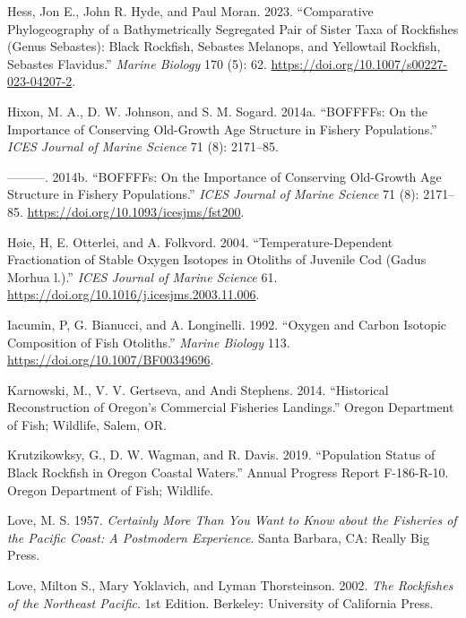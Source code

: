 \documentclass[11pt,
  english,
  letterpaper,
]{article}
\newlength{\cslhangindent}
\newenvironment{CSLReferences}[2] %
 {%
  \setlength{\parindent}{0pt}
  \ifodd #1 \everypar{\setlength{\hangindent}{\cslhangindent}}\ignorespaces\fi
  \ifnum #2 > 0
  \setlength{\parskip}{#2\baselineskip}
  \fi
 }%
 {}
\begin{document}
\begin{CSLReferences}{1}{0}
\leavevmode{}%
Hess, Jon E., John R. Hyde, and Paul Moran. 2023. {``Comparative Phylogeography of a Bathymetrically Segregated Pair of Sister Taxa of Rockfishes (Genus Sebastes): Black Rockfish, Sebastes Melanops, and Yellowtail Rockfish, Sebastes Flavidus.''} \emph{Marine Biology} 170 (5): 62. \url{https://doi.org/10.1007/s00227-023-04207-2}.

\leavevmode{}%
Hixon, M. A., D. W. Johnson, and S. M. Sogard. 2014a. {``BOFFFFs: On the Importance of Conserving Old-Growth Age Structure in Fishery Populations.''} \emph{ICES Journal of Marine Science} 71 (8): 2171--85.

\leavevmode{}%
---------. 2014b. {``{BOFFFFs}: On the Importance of Conserving Old-Growth Age Structure in Fishery Populations.''} \emph{{ICES} Journal of Marine Science} 71 (8): 2171--85. \url{https://doi.org/10.1093/icesjms/fst200}.

\leavevmode{}%
Høie, H, E. Otterlei, and A. Folkvord. 2004. {``Temperature-Dependent Fractionation of Stable Oxygen Isotopes in Otoliths of Juvenile Cod (Gadus Morhua l.).''} \emph{ICES Journal of Marine Science} 61. \url{https://doi.org/10.1016/j.icesjms.2003.11.006}.

\leavevmode{}%
Iacumin, P, G. Bianucci, and A. Longinelli. 1992. {``Oxygen and Carbon Isotopic Composition of Fish Otoliths.''} \emph{Marine Biology} 113. \url{https://doi.org/10.1007/BF00349696}.

\leavevmode{}%
Karnowski, M., V. V. Gertseva, and Andi Stephens. 2014. {``Historical {Reconstruction} of {Oregon}'s {Commercial} {Fisheries} {Landings}.''} Oregon Department of Fish; Wildlife, Salem, OR.

\leavevmode{}%
Krutzikowksy, G., D. W. Wagman, and R. Davis. 2019. {``Population Status of Black Rockfish in Oregon Coastal Waters.''} Annual Progress Report F-186-R-10. Oregon Department of Fish; Wildlife.

\leavevmode{}%
Love, M. S. 1957. \emph{Certainly More Than You Want to Know about the Fisheries of the Pacific Coast: A Postmodern Experience}. Santa Barbara, CA: Really Big Press.

\leavevmode{}%
Love, Milton S., Mary Yoklavich, and Lyman Thorsteinson. 2002. \emph{The Rockfishes of the Northeast Pacific}. 1st Edition. Berkeley: University of California Press.


\end{CSLReferences}
\end{document}
